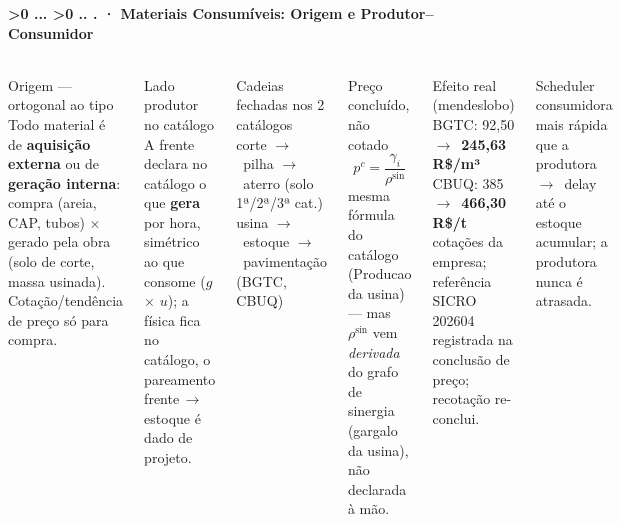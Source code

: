 \documentclass[aspectratio=169,10pt]{beamer}
\newcommand{\arr}{$\rightarrow$}
\newcounter{mlc3}[subsection]
\newcounter{mlc4}[mlc3]
\newcommand{\pathnum}{%
  \ifnum\value{mlc4}>0
    \thesection.\thesubsection.\arabic{mlc3}.\arabic{mlc4}%
  \else\ifnum\value{mlc3}>0
    \thesection.\thesubsection.\arabic{mlc3}%
  \else
    \thesection.\thesubsection%
  \fi\fi
}
\newcommand{\lvlA}{\stepcounter{mlc3}}   %
\newcommand{\mtitle}[1]{%
  \frametitle{\insertsection}%
  \framesubtitle{\pathnum\;·\; #1}}
\begin{document}
\lvlA
\begin{frame}
  \mtitle{Materiais Consumíveis: Origem e Produtor--Consumidor}
  \begin{columns}[T]
    \begin{block}{Origem — ortogonal ao tipo}
      \scriptsize
      Todo material é de \textbf{aquisição externa} ou de
      \textbf{geração interna}:\\[2pt]
      compra (areia, CAP, tubos) $\times$ gerado pela obra (solo de
      corte, massa usinada). Cotação/tendência de preço só para compra.
    \end{block}
    \vspace{4pt}
    \begin{block}{Lado produtor no catálogo}
      \scriptsize A frente declara no catálogo o que \textbf{gera} por
      hora, simétrico ao que consome ($g$ $\times$ $u$); a física fica
      no catálogo, o pareamento frente\,\arr\,estoque é dado de projeto.
    \end{block}
    \vspace{4pt}
    \begin{exampleblock}{\small Cadeias fechadas nos 2 catálogos}
      \scriptsize corte \arr\ pilha \arr\ aterro (solo 1ª/2ª/3ª cat.)\\
      usina \arr\ estoque \arr\ pavimentação (BGTC, CBUQ)
    \end{exampleblock}
    \begin{block}{Preço concluído, não cotado}
      \[
        p^c = \frac{\gamma_i}{\rho^{\text{sin}}}
      \]
      \scriptsize mesma fórmula do catálogo (Producao da usina) — mas
      $\rho^{\text{sin}}$ vem \emph{derivada} do grafo de sinergia
      (gargalo da usina), não declarada à mão.
    \end{block}
    \vspace{4pt}
    \begin{block}{Efeito real (mendeslobo)}
      \scriptsize BGTC: 92{,}50 \arr\ \textbf{245{,}63 R\$/m³}\\
      CBUQ: 385 \arr\ \textbf{466{,}30 R\$/t}\\
      \tiny cotações da empresa; referência SICRO 202604 registrada na
      conclusão de preço; recotação re-conclui.
    \end{block}
    \vspace{4pt}
    \begin{block}{Scheduler}
      \scriptsize consumidora mais rápida que a produtora \arr\ delay
      até o estoque acumular; a produtora nunca é atrasada.
    \end{block}
  \end{columns}
\end{frame}
\end{document}
